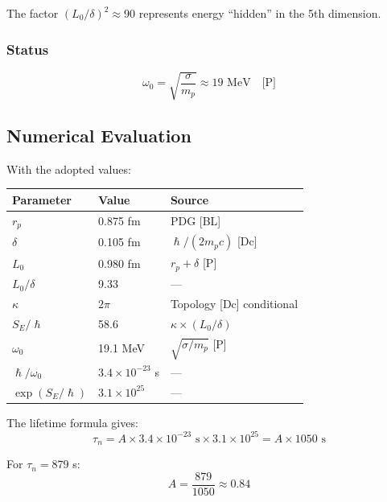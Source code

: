\documentclass[11pt,a4paper]{article}
\newcommand{\hbar}{\hslash}
\begin{document}
The factor $(L_0/\delta)^2 \approx 90$ represents energy ``hidden'' in the 5th dimension.

\subsubsection{Status}

\begin{equation}
\boxed{\omega_0 = \sqrt{\frac{\sigma}{m_p}} \approx 19 \text{ MeV} \quad \text{[P]}}
\end{equation}

\subsection{Numerical Evaluation}

With the adopted values:

\begin{center}
\begin{tabular}{lll}
\toprule
\textbf{Parameter} & \textbf{Value} & \textbf{Source} \\
\midrule
$r_p$ & 0.875 fm & PDG [BL] \\
$\delta$ & 0.105 fm & $\hbar/(2m_p c)$ [Dc] \\
$L_0$ & 0.980 fm & $r_p + \delta$ [P] \\
$L_0/\delta$ & 9.33 & --- \\
$\kappa$ & $2\pi$ & Topology [Dc] conditional \\
$S_E/\hbar$ & 58.6 & $\kappa \times (L_0/\delta)$ \\
$\omega_0$ & 19.1 MeV & $\sqrt{\sigma/m_p}$ [P] \\
$\hbar/\omega_0$ & $3.4 \times 10^{-23}$ s & --- \\
$\exp(S_E/\hbar)$ & $3.1 \times 10^{25}$ & --- \\
\bottomrule
\end{tabular}
\end{center}

The lifetime formula gives:
\begin{equation}
\tau_n = A \times 3.4 \times 10^{-23} \text{ s} \times 3.1 \times 10^{25} = A \times 1050 \text{ s}
\end{equation}

For $\tau_n = 879$ s:
\begin{equation}
A = \frac{879}{1050} \approx 0.84
\end{equation}
\end{document}
